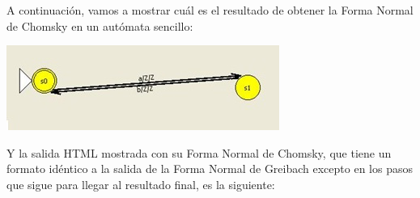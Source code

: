 \documentclass[12pt,a4paper,spanish]{book}
\begin{document}
A continuaci\'on, vamos a mostrar cu\'al es el resultado de obtener la Forma Normal de Chomsky en un aut\'omata sencillo:\\
\begin{center}
\includegraphics{chom1.jpg}
\end{center}

Y la salida HTML mostrada con su Forma Normal de Chomsky, que tiene un formato id\'entico a la salida de la Forma Normal de Greibach excepto en los pasos que sigue para llegar al resultado final, es la siguiente:\\
\newpage
\end{document}
